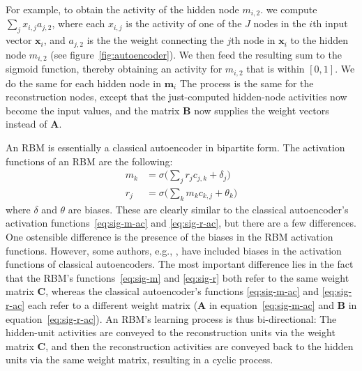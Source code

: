 For example, to obtain the activity of the hidden node $m_{i,2}$.
we compute $\sum_{j} x_{i,j} a_{j,2}$, where each $x_{i,j}$ is the activity of one of the $J$ nodes in the $i$th input vector $\textbf{x}_i$, and $a_{j,2}$ is the the weight connecting the $j$th node in $\textbf{x}_i$ to the hidden node $m_{i,2}$ (see figure~\ref{fig:autoencoder}).
We then feed the resulting sum to the sigmoid function, thereby obtaining an activity for $m_{i,2}$ that is within $[0,1]$. 
We do the same for each hidden node in $\textbf{m}_i$
The process is the same for the reconstruction nodes, except that the just-computed hidden-node activities now become the input values, and the matrix $\textbf{B}$ now supplies the weight vectors instead of $\textbf{A}$.

An RBM is essentially a 
classical autoencoder in bipartite form.
The activation functions of an RBM are the following: 
\begin{align}
\label{eq:sig-m}
m_{k} &= \sigma\big(\sum_{j} r_{j} c_{j,k} + \delta_{j}\big) \\
\label{eq:sig-r}
r_{j} &= \sigma\big(\sum_{k}  m_{k} c_{k,j} + \theta_{k}\big)
\end{align}
where $\delta$ and $\theta$ are biases. 
These are clearly similar to the classical autoencoder's activation 
functions~\eqref{eq:sig-m-ac} and \eqref{eq:sig-r-ac},
but there are a few differences. One ostensible difference 
is the presence of the biases in the 
RBM activation functions. However, some authors, e.g., \citet{rudy-and-taylor:2014}, have included biases in the activation functions of classical autoencoders. %
The most important difference
lies in the fact that the RBM's functions~\eqref{eq:sig-m} and \eqref{eq:sig-r} 
both refer to the same weight matrix $\textbf{C}$, whereas the classical 
autoencoder's  functions \eqref{eq:sig-m-ac} and \eqref{eq:sig-r-ac} each 
refer to a different weight matrix 
($\textbf{A}$ in equation~\eqref{eq:sig-m-ac} and $\textbf{B}$ in equation~\eqref{eq:sig-r-ac}). 
An RBM's learning process is thus bi-directional: 
The hidden-unit activities are conveyed to the reconstruction 
units via the weight matrix $\textbf{C}$, and then the reconstruction 
activities are conveyed back to the hidden units via the same weight matrix, resulting in a cyclic process. 

